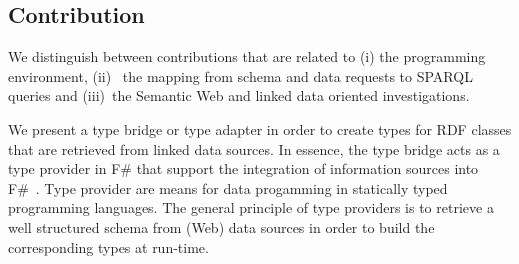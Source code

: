 \documentclass{llncs} %
\newcommand{\fs}{\textsf{F\#}\xspace}
\begin{document}





\subsection{Contribution}

We distinguish between contributions 
that are related to (i) the programming environment, (ii)~ the mapping from
schema and data requests to SPARQL queries and (iii)~the Semantic Web and linked data
oriented investigations.


We present a type bridge or type adapter in order to create types for RDF classes that
are retrieved from linked data sources. 
In essence, the type bridge acts as a type provider in \fs that support the integration of information sources
into \fs~\cite{Syme2012fsharp}. Type provider are means for data progamming
in statically typed programming languages.
The general principle of type providers is 
to retrieve a well structured schema from (Web) data sources in order to build
the corresponding types at run-time.
\end{document}
